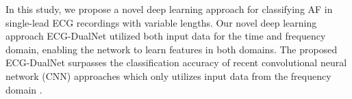 \indent In this study, we propose a novel deep learning approach for classifying AF in single-lead ECG recordings with variable lengths. Our novel deep learning approach ECG-DualNet utilized both input data for the time and frequency domain, enabling the network to learn features in both domains. The proposed ECG-DualNet surpasses the classification accuracy of recent convolutional neural network (CNN) approaches which only utilizes input data from the frequency domain \cite{Zihlmann2017}.


